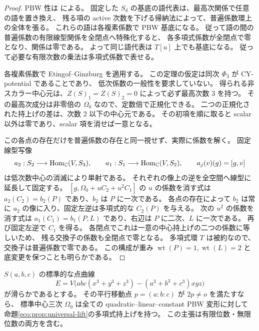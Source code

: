\begin{proof}
PBW 性は \cite[Theorem~3.1]{NFMBeTa}による。
固定した $S_d$ の基底の語代表は、最高次関係で任意の語を置き換え、
残る項の active 次数を下げる帰納法によって、普遍係数環上の全体を張る。
これらの語は各複素係数で PBW 基底になる。
従って語の間の普遍係数の有限線型関係を全閉点へ特殊化すると、
各多項式係数が全閉点で零となり、関係は零である。
よって同じ語代表は $T[u]$ 上でも基底になる。
従って必要な有限次数の乗法は多項式係数で表せる。

各複素係数で Etingof--Ginzburg
\cite[Theorem~3.3.2(ii); proof in Section~8.3, pp.~1410--1411]{NFMEG}を適用する。
この定理の仮定は同次 $\Phi_3$ が CY-potential であることであり、
低次係数の一般性を要求していない。
得られる非スカラー中心元は、$Z(S)_1=Z(S)_2=0$ によって必ず最高次数 $3$ を持つ。
その最高次成分は非零倍の $\Omega_0$ なので、定数倍で正規化できる。
二つの正規化された持上げの差は、次数 $2$ 以下の中心元である。
その初項を順に取ると scalar 以外は零であり、scalar 項を消せば一意となる。

この各点の存在だけを普遍係数の存在と同一視せず、実際に係数を解く。
固定線型写像
\[
 a_2:S_2\longrightarrow\operatorname{Hom}_{\mathbb C}(V,S_3),\qquad
 a_1:S_1\longrightarrow\operatorname{Hom}_{\mathbb C}(V,S_2),\qquad
 a_j(v)(g)=[g,v]
\]
は低次数中心の消滅により単射である。
それぞれの像上の逆を全空間へ線型に延長して固定する。
$[g,\Omega_0+uC_2+u^2C_1]$ の $u$ の係数を消す式は
$a_2(C_2)=b_2(P)$ であり、$b_2$ は $P$ に一次である。
各点の存在によって $b_2$ は常に $a_2$ の像に入り、固定左逆は多項式的な
$C_2(P)$ を与える。
次の $u^2$ の係数を消す式は
$a_1(C_1)=b_1(P,L)$ であり、右辺は $P$ に二次、$L$ に一次である。
再び固定左逆で $C_1$ を得る。
各閉点でこれは一意の中心持上げの二つの係数に等しいため、
残る交換子の係数も全閉点で零となる。
多項式環 $T$ は被約なので、交換子は普遍係数で零である。
この構成が重み $\operatorname{wt}(P)=1,\operatorname{wt}(L)=2$ と底変更を保つことも明らかである。
\end{proof}

\begin{corollary}
\label{eco:cor:non-clifford-lift}
$S(a,b,c)$ の標準的な点曲線
\[
 E=V\bigl(abc(x^3+y^3+z^3)-(a^3+b^3+c^3)xyz\bigr)
\]
が滑らかであるとする。
その平行移動点 $p=(a:b:c)$ が $2p\ne o$ を満たすなら、
標準中心三次 $\Omega_0$ は全ての quadratic--linear--constant PBW 変形に対して
命題\ref{eco:prop:universal-lift}の多項式持上げを持つ。
この主張は有限位数・無限位数の両方を含む。
\end{corollary}

